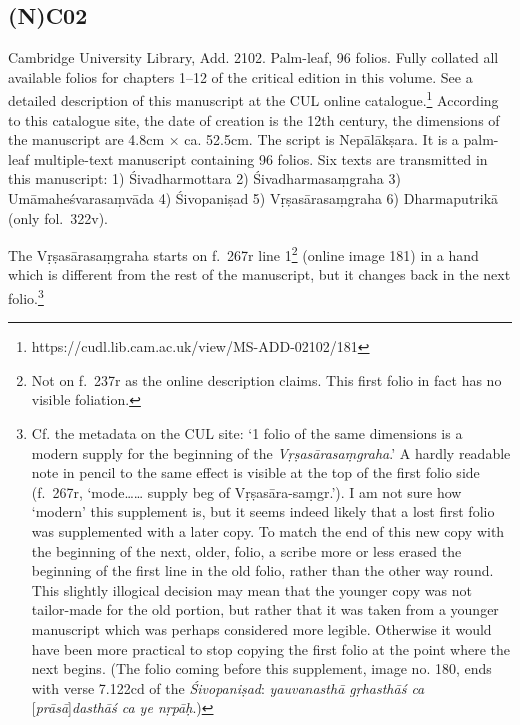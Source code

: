 \documentclass[12pt]{book}
\begin{document}
{%
\subsection{(N)C02}\label{nc02}}

Cambridge University Library, Add. 2102. Palm-leaf, 96 folios. Fully
collated all available folios for chapters 1--12 of the critical edition
in this volume. See a detailed description of this manuscript at the CUL
online catalogue.\footnote{https://cudl.lib.cam.ac.uk/view/MS-ADD-02102/181}
According to this catalogue site, the date of creation is the 12th
century, the dimensions of the manuscript are 4.8cm × ca. 52.5cm. The
script is Nepālākṣara. It is a palm-leaf multiple-text manuscript
containing 96 folios. Six texts are transmitted in this manuscript: 1)
Śivadharmottara 2) Śivadharmasaṃgraha 3) Umāmaheśvarasaṃvāda 4)
Śivopaniṣad 5) Vṛṣasārasaṃgraha 6) Dharmaputrikā (only fol.~322v).

The Vṛṣasārasaṃgraha starts on f.~267r line 1\footnote{Not on f.~237r as
  the online description claims. This first folio in fact has no visible
  foliation.} (online image 181) in a hand which is different from the
rest of the manuscript, but it changes back in the next folio.\footnote{Cf.
  the metadata on the CUL site: `1 folio of the same dimensions is a
  modern supply for the beginning of the \emph{Vṛṣasārasaṃgraha}.' A
  hardly readable note in pencil to the same effect is visible at the
  top of the first folio side (f.~267r, `mode\ldots{}\ldots{} supply beg
  of Vṛṣasāra-saṃgr.'). I am not sure how `modern' this supplement is,
  but it seems indeed likely that a lost first folio was supplemented
  with a later copy. To match the end of this new copy with the
  beginning of the next, older, folio, a scribe more or less erased the
  beginning of the first line in the old folio, rather than the other
  way round. This slightly illogical decision may mean that the younger
  copy was not tailor-made for the old portion, but rather that it was
  taken from a younger manuscript which was perhaps considered more
  legible. Otherwise it would have been more practical to stop copying
  the first folio at the point where the next begins. (The folio coming
  before this supplement, image no. 180, ends with verse 7.122cd of the
  \emph{Śivopaniṣad}: \emph{yauvanasthā gṛhasthāś ca}
  {[}\emph{prāsā}{]}\emph{dasthāś ca ye nṛpāḥ}.)}
\end{document}
